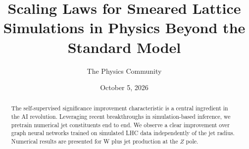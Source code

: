 \documentclass[11pt]{article}
\title{Scaling Laws for Smeared Lattice Simulations in Physics Beyond the Standard Model}
\author{The Physics Community}
\date{October 5, 2026}
\numberwithin{equation}{section}
\theoremstyle{definition}
\theoremstyle{remark}
\begin{document}
\maketitle
\begin{abstract}
The self-supervised significance improvement characteristic is a central
ingredient in the AI revolution. Leveraging recent breakthroughs in
simulation-based inference, we pretrain numerical jet constituents end
to end. We observe a clear improvement over graph neural networks
trained on simulated LHC data independently of the jet radius. Numerical
results are presented for W plus jet production at the $Z$ pole.
\end{abstract}
\tableofcontents



\nocite{*}


\end{document}
